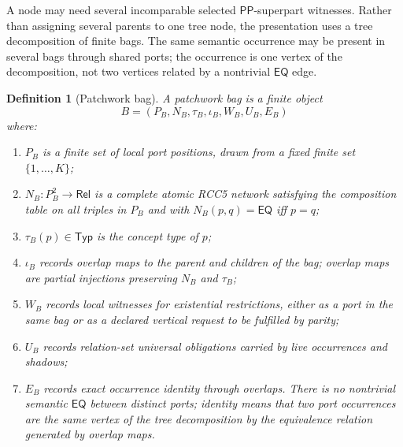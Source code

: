 \documentclass[11pt]{article}
\newtheorem{definition}[theorem]{Definition}
\newcommand{\Rel}{\mathsf{Rel}}
\newcommand{\EQ}{\mathsf{EQ}}
\newcommand{\PP}{\mathsf{PP}}
\begin{document}
A node may need several incomparable selected $\PP$-superpart witnesses.  Rather than
assigning several parents to one tree node, the presentation uses a tree decomposition of
finite bags.  The same semantic occurrence may be present in several bags through shared
ports; the occurrence is one vertex of the decomposition, not two vertices related by a
nontrivial $\EQ$ edge.

\begin{definition}[Patchwork bag]
A patchwork bag is a finite object
\[
B=(P_B,N_B,\tau_B,\iota_B,W_B,U_B,E_B)
\]
where:
\begin{enumerate}[label=(B\arabic*)]
\item $P_B$ is a finite set of local port positions, drawn from a fixed finite set
$\{1,\ldots,K\}$;
\item $N_B:P_B^2\to\Rel$ is a complete atomic RCC5 network satisfying the composition
table on all triples in $P_B$ and with $N_B(p,q)=\EQ$ iff $p=q$;
\item $\tau_B(p)\in\mathsf{Typ}$ is the concept type of $p$;
\item $\iota_B$ records overlap maps to the parent and children of the bag; overlap maps
are partial injections preserving $N_B$ and $\tau_B$;
\item $W_B$ records local witnesses for existential restrictions, either as a port in the
same bag or as a declared vertical request to be fulfilled by parity;
\item $U_B$ records relation-set universal obligations carried by live occurrences and
shadows;
\item $E_B$ records exact occurrence identity through overlaps.  There is no nontrivial
semantic $\EQ$ between distinct ports; identity means that two port occurrences are the
same vertex of the tree decomposition by the equivalence relation generated by overlap
maps.
\end{enumerate}
\end{definition}
\end{document}
